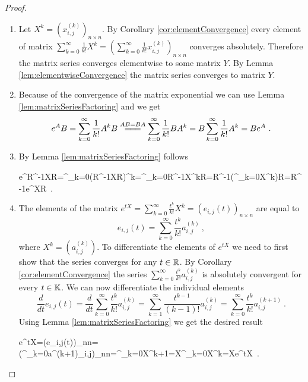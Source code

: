 \begin{proof}
	\begin{enumerate}
		\sloppy
		\item Let $X^k=(x_{i,j}^{(k)})_{n\times n}$. By Corollary \ref{cor:elementConvergence} every element of matrix $\sum^\infty_{k=0}\frac{1}{k!}X^k=\left(\sum^\infty_{k=0}\frac{1}{k!}x^{(k)}_{i,j}\right)_{n\times n}$ converges absolutely. Therefore the matrix series converges elementwise to some matrix $Y$. By Lemma \ref{lem:elementwiseConvergence} the matrix series converges to matrix $Y$.

		\item
		Because of the convergence of the matrix exponential we can use Lemma \ref{lem:matrixSeriesFactoring} and we get
		$$e^{A}B=\sum^\infty_{k=0}\frac{1}{k!}A^{k}B\stackrel{AB=BA}{=\joinrel=\joinrel=}\sum^\infty_{k=0}\frac{1}{k!}BA^{k}=B\sum^\infty_{k=0}\frac{1}{k!}A^{k}=Be^{A}\ .$$
		
		\item By Lemma \ref{lem:matrixSeriesFactoring} follows
		\begin{longeq}
			e^{R^{-1}XR}=\sum^\infty_{k=0}(R^{-1}XR)^{k}=\sum^\infty_{k=0}R^{-1}X^{k}R=R^{-1}\left(\sum^\infty_{k=0}X^{k}\right)R=R^{-1}e^{X}R\ . 
		\end{longeq}

		\item The elements of the matrix $e^{tX}=\sum^\infty_{k=0}\frac{t^k}{k!}X^{k}=(e_{i,j}(t))_{n\times n}$ are equal to
		$$e_{i,j}(t)=\sum^\infty_{k=0}\frac{t^k}{k!}a^{(k)}_{i,j}\ ,$$
		where $X^k=(a^{(k)}_{i,j})$. To differentiate the elements of $e^{tX}$ we need to first show that the series converges for any $t\in\mathbb{R}$. By Corollary \ref{cor:elementConvergence} the series $\sum^\infty_{k=0}\frac{t^k}{k!}a^{(k)}_{i,j}$ is absolutely convergent for every $t\in\mathbb{K}$. We can now differentiate the individual elements 
		$$\frac{d}{dt}e_{i,j}(t)=\frac{d}{dt}\sum^\infty_{k=0}\frac{t^k}{k!}a^{(k)}_{i,j}=\sum^\infty_{k=1}\frac{t^{k-1}}{(k-1)!}a^{(k)}_{i,j}=\sum^\infty_{k=0}\frac{t^{k}}{k!}a^{(k+1)}_{i,j}\ .$$ 
		Using Lemma \ref{lem:matrixSeriesFactoring} we get the desired result
		\begin{longeq}
			e^{tX}=\left(e_{i,j}(t)\right)_{n\times n}=\left(\sum^\infty_{k=0}a^{(k+1)}_{i,j}\right)_{n\times n}=\sum^\infty_{k=0}X^{k+1}=X\sum^\infty_{k=0}X^{k}=Xe^{tX}\ .
		\end{longeq}


\end{enumerate}
\end{proof}
